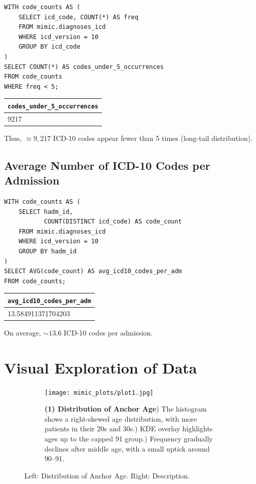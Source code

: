 \documentclass[12pt,a4paper]{report}
\begin{document}
\begin{verbatim}
WITH code_counts AS (
    SELECT icd_code, COUNT(*) AS freq
    FROM mimic.diagnoses_icd
    WHERE icd_version = 10
    GROUP BY icd_code
)
SELECT COUNT(*) AS codes_under_5_occurrences
FROM code_counts
WHERE freq < 5;
\end{verbatim}
\begin{center}
\begin{tabular}{l}
\hline
\texttt{codes\_under\_5\_occurrences} \\
\hline
9217 \\
\hline
\end{tabular}
\end{center}
Thus, \(\approx9{,}217\) ICD-10 codes appear fewer than 5 times (long-tail distribution).

\subsection{Average Number of ICD-10 Codes per Admission}
\begin{verbatim}
WITH code_counts AS (
    SELECT hadm_id,
           COUNT(DISTINCT icd_code) AS code_count
    FROM mimic.diagnoses_icd
    WHERE icd_version = 10
    GROUP BY hadm_id
)
SELECT AVG(code_count) AS avg_icd10_codes_per_adm
FROM code_counts;
\end{verbatim}
\begin{center}
\begin{tabular}{l}
\hline
\texttt{avg\_icd10\_codes\_per\_adm} \\
\hline
13.584911371704203 \\
\hline
\end{tabular}
\end{center}
On average, \(\sim13.6\) ICD-10 codes per admission.

\section{Visual Exploration of Data}

\begin{figure}[ht!]
    \centering
    \begin{subfigure}{0.42\textwidth}
        \texttt{[image: mimic\_plots/plot1.jpg]}
    \end{subfigure}\hfill
    \begin{subfigure}{0.54\textwidth}
        \footnotesize
        \textbf{(1) Distribution of Anchor Age}) The histogram shows a right-skewed age distribution, with more patients in their 20s and 30s.) KDE overlay highlights ages up to the capped 91 group.) Frequency gradually declines after middle age, with a small uptick around 90--91.
    \end{subfigure}
    \caption{Left: Distribution of Anchor Age. Right: Description.}
    \label{fig:plot1}
\end{figure}
\end{document}
